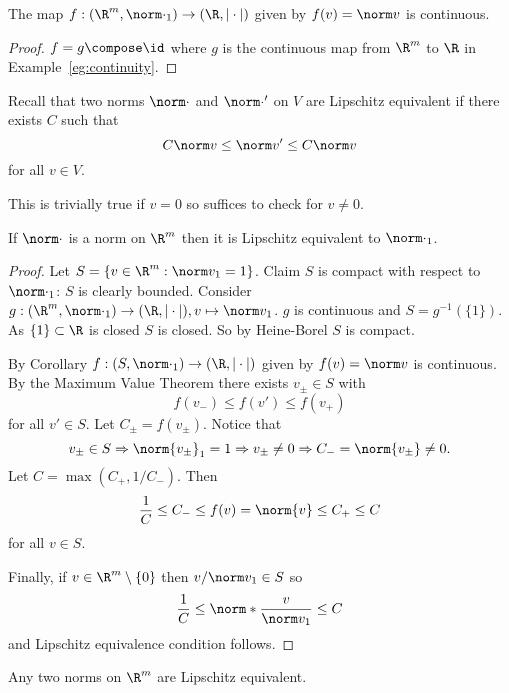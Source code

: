 \documentclass[a4paper]{article}
\theoremstyle{definition}
\begin{document}
\begin{corollary}
  The map \(f:(\R^m, \norm \cdot_1) \to (\R, |\cdot|)\) given by \(f(v) = \norm v\) is continuous.
\end{corollary}

\begin{proof}
  \(f = g\compose \id\) where \(g\) is the continuous map from \(\R^m\) to \(\R\) in Example~\ref{eg:continuity}.
\end{proof}

Recall that two norms \(\norm \cdot\) and \(\norm \cdot'\) on \(V\) are Lipschitz equivalent if there exists \(C\) such that
\[
  C\norm v \leq \norm v' \leq C \norm v
\]
for all \(v\in V\).

\begin{remark}
  This is trivially true if \(v=0\) so suffices to check for \(v\neq0\).
\end{remark}

\begin{theorem}
  If \(\norm \cdot\) is a norm on \(\R^m\) then it is Lipschitz equivalent to \(\norm \cdot_1\).
\end{theorem}

\begin{proof}
  Let \(S = \{v\in \R^m: \norm v_1 = 1 \}\). Claim \(S\) is compact with respect to \(\norm \cdot_1\): \(S\) is clearly bounded. Consider \(g:(\R^m, \norm \cdot_1) \to (\R, |\cdot|), v\mapsto \norm v_1\). \(g\) is continuous and \(S = g^{-1}(\{1\})\). As \(\{1\} \subset \R\) is closed \(S\) is closed. So by Heine-Borel \(S\) is compact.

  By Corollary \(f:(S, \norm \cdot_1) \to (\R, |\cdot|)\) given by \(f(v) = \norm v\) is continuous. By the Maximum Value Theorem there exists \(v_\pm\in S\) with
  \[
    f(v_-) \leq f(v') \leq f(v_+)
  \]
  for all \(v' \in S\). Let \(C_\pm = f(v_\pm)\). Notice that
  \[
    v_\pm\in S \Rightarrow \norm{v_\pm}_1 = 1 \Rightarrow v_\pm \neq0 \Rightarrow C_-=\norm{v_\pm} \neq 0.
  \]
  Let \(C = \max(C_+,1/C_-)\). Then
  \[
    \frac{1}{C} \leq C_- \leq f(v) = \norm{v} \leq C_+ \leq C
  \]
  for all \(v \in S\).

  Finally, if \(v \in \R^m\setminus\{0\}\) then \(v/\norm v_1 \in S\) so
  \[
    \frac{1}{C} \leq \norm*{\frac{v}{\norm v_1}} \leq C
  \]
  and Lipschitz equivalence condition follows.
\end{proof}

\begin{corollary}
  Any two norms on \(\R^m\) are Lipschitz equivalent.
\end{corollary}
\end{document}
